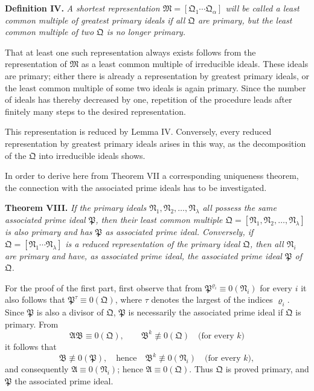 \documentclass[11pt]{article}
\newcommand{\ideal}[1]{\mathfrak{#1}}
\begin{document}
\textbf{Definition IV.} \emph{A shortest representation $\ideal M=[\ideal Q_1\cdots\ideal Q_\alpha]$ will be called a least common multiple of greatest primary ideals if all $\ideal Q$ are primary, but the least common multiple of two $\ideal Q$ is no longer primary.}

That at least one such representation always exists follows from the representation of $\ideal M$ as a least common multiple of irreducible ideals. These ideals are primary; either there is already a representation by greatest primary ideals, or the least common multiple of some two ideals is again primary. Since the number of ideals has thereby decreased by one, repetition of the procedure leads after finitely many steps to the desired representation.

This representation is reduced by Lemma IV. Conversely, every reduced representation by greatest primary ideals arises in this way, as the decomposition of the $\ideal Q$ into irreducible ideals shows.

In order to derive here from Theorem VII a corresponding uniqueness theorem, the connection with the associated prime ideals has to be investigated.

\textbf{Theorem VIII.} \emph{If the primary ideals $\ideal N_1,\ideal N_2,\ldots,\ideal N_\lambda$ all possess the same associated prime ideal $\ideal P$, then their least common multiple $\ideal Q=[\ideal N_1,\ideal N_2,\ldots,\ideal N_\lambda]$ is also primary and has $\ideal P$ as associated prime ideal. Conversely, if $\ideal Q=[\ideal N_1\cdots\ideal N_\lambda]$ is a reduced representation of the primary ideal $\ideal Q$, then all $\ideal N_i$ are primary and have, as associated prime ideal, the associated prime ideal $\ideal P$ of $\ideal Q$.}

For the proof of the first part, first observe that from $\ideal P^{\varrho_i}\equiv0(\ideal N_i)$ for every $i$ it also follows that $\ideal P^\tau\equiv0(\ideal Q)$, where $\tau$ denotes the largest of the indices $\varrho_i$. Since $\ideal P$ is also a divisor of $\ideal Q$, $\ideal P$ is necessarily the associated prime ideal if $\ideal Q$ is primary. From
\[
 \ideal A\ideal B\equiv0(\ideal Q),
 \qquad
 \ideal B^k\not\equiv0(\ideal Q)\quad\text{(for every }k)
\]
it follows that
\[
 \ideal B\not\equiv0(\ideal P),
 \quad\text{hence}\quad
 \ideal B^k\not\equiv0(\ideal N_i)\quad\text{(for every }k),
\]
and consequently $\ideal A\equiv0(\ideal N_i)$; hence $\ideal A\equiv0(\ideal Q)$. Thus $\ideal Q$ is proved primary, and $\ideal P$ the associated prime ideal.
\end{document}
